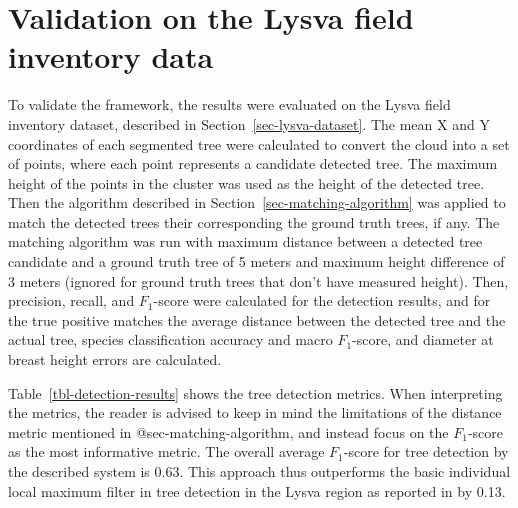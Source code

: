 \section{Validation on the Lysva field inventory data}

To validate the framework, the results were evaluated on the Lysva field inventory dataset, described in Section~\ref{sec-lysva-dataset}.
The mean X and Y coordinates of each segmented tree were calculated to convert the cloud into a set of points, where each point represents a candidate detected tree.
The maximum height of the points in the cluster was used as the height of the detected tree.
Then the algorithm described in Section~\ref{sec-matching-algorithm} was applied to match the detected trees their corresponding the ground truth trees, if any.
The matching algorithm was run with maximum distance between a detected tree candidate and a ground truth tree of 5 meters and maximum height difference of 3 meters (ignored for ground truth trees that don't have measured height).
Then, precision, recall, and $F_1$-score were calculated for the detection results, and for the true positive matches the average distance between the detected tree and the actual tree, species classification accuracy and macro $F_1$-score, and diameter at breast height errors are calculated.

Table~\ref{tbl-detection-results} shows the tree detection metrics.
When interpreting the metrics, the reader is advised to keep in mind the limitations of the distance metric mentioned in @sec-matching-algorithm, and instead focus on the $F_1$-score as the most informative metric.
The overall average $F_1$-score for tree detection by the described system is 0.63.
This approach thus outperforms the basic individual local maximum filter in tree detection in the Lysva region as reported in \citet{dubrovinOpenDatasetIndividual2024} by 0.13.

